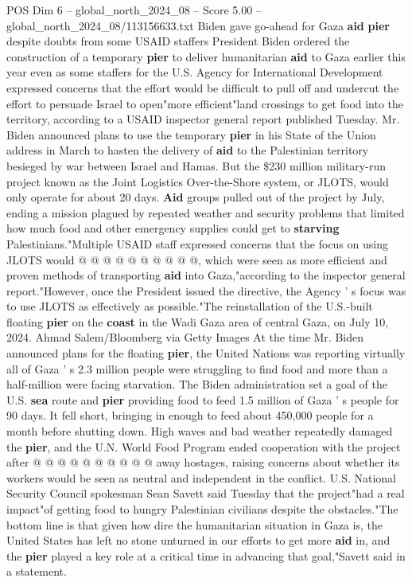 \begin{textsample}{POS Dim 6 – global\_north\_2024\_08 – Score 5.00 – global\_north\_2024\_08/113156633.txt}  \label{ex:f6_pos_378}
Biden gave go-ahead for Gaza \textbf{aid} \textbf{pier} despite doubts from some USAID staffers President Biden ordered the construction of a temporary \textbf{pier} to deliver humanitarian \textbf{aid} to Gaza earlier this year even as some staffers for the U.S.
Agency for International Development expressed concerns that the effort would be difficult to pull off and undercut the effort to persuade Israel to open"more efficient"land crossings to get food into the territory, according to a USAID inspector general report published Tuesday.
Mr.
Biden announced plans to use the temporary \textbf{pier} in his State of the Union address in March to hasten the delivery of \textbf{aid} to the Palestinian territory besieged by war between Israel and Hamas.
But the \$230 million military-run project known as the Joint Logistics Over-the-Shore system, or JLOTS, would only operate for about 20 days. \textbf{Aid} groups pulled out of the project by July, ending a mission plagued by repeated weather and security problems that limited how much food and other emergency supplies could get to \textbf{starving} Palestinians."Multiple USAID staff expressed concerns that the focus on using JLOTS would @ @ @ @ @ @ @ @ @ @, which were seen as more efficient and proven methods of transporting \textbf{aid} into Gaza,"according to the inspector general report."However, once the President issued the directive, the Agency ' s focus was to use JLOTS as effectively as possible."The reinstallation of the U.S.-built floating \textbf{pier} on the \textbf{coast} in the Wadi Gaza area of central Gaza, on July 10, 2024.
Ahmad Salem/Bloomberg via Getty Images At the time Mr.
Biden announced plans for the floating \textbf{pier}, the United Nations was reporting virtually all of Gaza ' s 2.3 million people were struggling to find food and more than a half-million were facing starvation.
The Biden administration set a goal of the U.S. \textbf{sea} route and \textbf{pier} providing food to feed 1.5 million of Gaza ' s people for 90 days.
It fell short, bringing in enough to feed about 450,000 people for a month before shutting down.
High waves and bad weather repeatedly damaged the \textbf{pier}, and the U.N.
World Food Program ended cooperation with the project after @ @ @ @ @ @ @ @ @ @ away hostages, raising concerns about whether its workers would be seen as neutral and independent in the conflict.
U.S.
National Security Council spokesman Sean Savett said Tuesday that the project"had a real impact"of getting food to hungry Palestinian civilians despite the obstacles."The bottom line is that given how dire the humanitarian situation in Gaza is, the United States has left no stone unturned in our efforts to get more \textbf{aid} in, and the \textbf{pier} played a key role at a critical time in advancing that goal,"Savett said in a statement.

\end{textsample}
